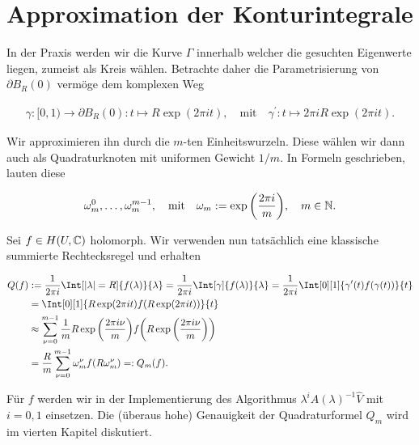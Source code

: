 \section{Approximation der Konturintegrale}

In der Praxis werden wir die Kurve $\Gamma$ innerhalb welcher die gesuchten Eigenwerte liegen, zumeist als Kreis wählen.
Betrachte daher die Parametrisierung von $\partial B_R(0)$ vermöge dem komplexen Weg

\begin{align*}
    \gamma: [0, 1) \to \partial B_R(0): t \mapsto R \exp(2 \pi i t),
    \quad
    \text{mit}
    \quad
    \gamma^\prime: t \mapsto 2 \pi i R \exp(2 \pi i t).
\end{align*}

Wir approximieren ihn durch die $m$-ten Einheitswurzeln.
Diese wählen wir dann auch als Quadraturknoten mit uniformen Gewicht $1 / m$.
In Formeln geschrieben, lauten diese

\begin{align*}
    \omega_m^0, \dots, \omega_m^{m - 1},
    \quad
    \text{mit}
    \quad
    \omega_m := \exp {\left ( \frac{2 \pi i}{m} \right )},
    \quad
    m \in \mathbb{N}.
\end{align*}

Sei $f \in H(U, \mathbb{C})$ holomorph.
Wir verwenden nun tatsächlich eine klassische summierte Rechtecksregel und erhalten

\begin{align*}
    Q(f)
    & :=
    \frac{1}{2 \pi i}
    \Int[|\lambda| = R]
    {
        f(\lambda)
    }{\lambda}
    =
    \frac{1}{2 \pi i}
    \Int[\gamma]
    {
        f(\lambda)
    }{\lambda}
    =
    \frac{1}{2 \pi i}
    \Int[0][1]
    {
        \gamma^\prime(t)
        f(\gamma(t))
    }{t} \\
    & =
    \Int[0][1]
    {
        R
        \exp(2 \pi i t)
        f(R \exp(2 \pi i t))
    }{t} \\
    &\approx
    \sum_{\nu = 0}^{m-1}
        \frac{1}{m}
        R \exp \pbraces{\frac{2 \pi i \nu}{m}}
        f
        \pbraces
        {
            R \exp \pbraces{\frac{2 \pi i \nu}{m}}
        } \\
    & =
    \frac{R}{m}
    \sum_{\nu = 0}^{m-1}
        \omega_m^\nu
        f(R \omega_m^\nu)
    =:
    Q_m(f).
\end{align*}

Für $f$ werden wir in der Implementierung des Algorithmus $\lambda^i A(\lambda)^{-1} \hat V$ mit $i = 0,1$ einsetzen.
Die (überaus hohe) Genauigkeit der Quadraturformel $Q_m$ wird im vierten Kapitel diskutiert.


